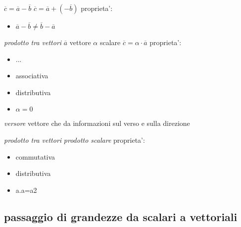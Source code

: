\documentclass{book}
\begin{document}
    $\overline{c}=\overline{a}-\overline{b}$ \newline
    $\overline{c}= \overline{a}+(-\overline{b})$ \newline
    proprieta':
\begin{itemize}
    \item $\overline{a}-\overline{b}\neq\overline{b}-\overline{a}$
\end{itemize}

\textit{prodotto tra vettori} \newline
    $\overline{a}$ vettore \newline
    $\alpha$ scalare \newline
    $\overline{c}= \alpha \cdot \overline{a}$
    proprieta':
    \begin{itemize}
        \item ...
        \item associativa
        \item distributiva
        \item $\alpha=0$
    \end{itemize}

    \textit{versore}
    vettore che da informazioni sul verso e sulla direzione

    \textit{prodotto tra vettori}
    \textit{prodotto scalare}
    proprieta':
    \begin{itemize}
        \item commutativa
        \item distributiva
        \item a.a=a2
    \end{itemize}
        
\subsection{passaggio di grandezze da scalari a vettoriali}    
\end{document}
